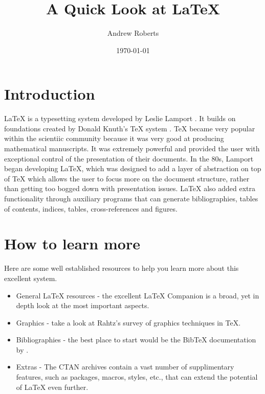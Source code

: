 \documentclass{article}
\newcommand{\BibTeX}{{\sc Bib}\TeX}
\begin{document}
\author{Andrew Roberts}
\title{A Quick Look at \LaTeX}
\date{\today}
\maketitle

\section{Introduction}

\LaTeX{} is a typesetting system developed by Leslie
Lamport \citep{lamport94}.  It builds on foundations created by Donald
Knuth's \TeX{} system \citep{knuth79}.  \TeX{} became very popular within
the scientiic community because it was very good at producing
mathematical manuscripts.  It was extremely powerful and provided the
user with exceptional control of the presentation of their documents.
In the 80s, Lamport began developing \LaTeX, which was designed to add a
layer of abstraction on top of \TeX{} which allows the user to focus
more on the document structure, rather than getting too bogged down with
presentation issues.  \LaTeX{} also added extra functionality through
auxiliary programs that can generate bibliographies, tables of contents,
indices, tables, cross-references and figures.

\section{How to learn more}
Here are some well established resources to help you learn more about
this excellent system.

\begin{itemize}

	\item General \LaTeX{} resources - the excellent \LaTeX{}
Companion \citep{goossens93} is a broad, yet in depth look at the most
important aspects.

	\item Graphics - take a look at Rahtz's survey \citep{rahtz89} of graphics
techniques in \TeX.

	\item Bibliographies - the best place to start would be the
\BibTeX{} documentation by \citet{patashnik88}.

	\item Extras - The CTAN archives\citep{greenwade93} contain a vast
number of supplimentary features, such as packages, macros, styles,
etc., that can extend the potential of \LaTeX{} even further.

\end{itemize}



\end{document}
